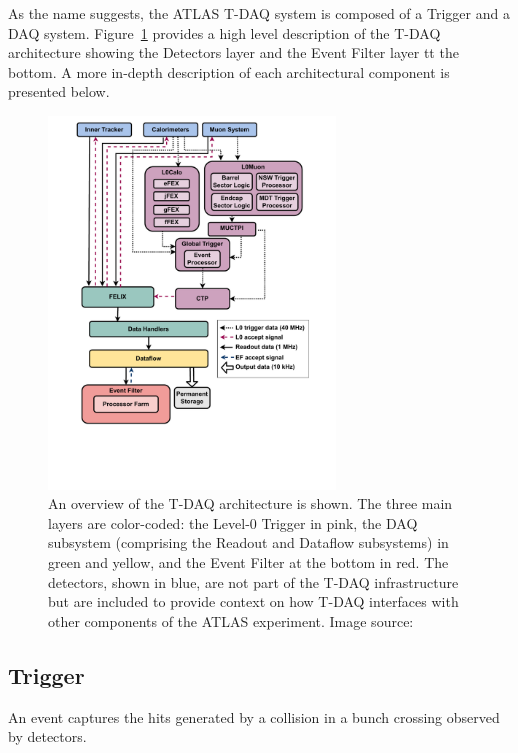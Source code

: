 As the name suggests, the \acs{ATLAS} \acf{T-DAQ} system is composed of a Trigger and a \acf{DAQ} system. Figure~\ref{fig:tdaq} provides a high level description of the \acs{T-DAQ} architecture showing the Detectors layer and the Event Filter layer tt the bottom. A more in-depth description of each architectural component is presented below.

\begin{figure}[htbp]
\centering
\includegraphics[width=0.68\textwidth]{images/introduction/Baseline_TDAQ_Phase-II_Architecture.pdf}
\caption[Overview of the T-DAQ architecture]{An overview of the \acs{T-DAQ} architecture is shown. The three main layers are color-coded: the Level-0 Trigger in pink, the DAQ subsystem (comprising the Readout and Dataflow subsystems) in green and yellow, and the Event Filter at the bottom in red. The detectors, shown in blue, are not part of the T-DAQ infrastructure but are included to provide context on how T-DAQ interfaces with other components of the \acs{ATLAS} experiment. Image source: \protect\cite{tdaq}}
\label{fig:tdaq}
\end{figure}

\subsection{Trigger}

\begin{definition}
\label{def:event}
An event captures the hits generated by a collision in a bunch crossing observed by detectors.
\end{definition}

